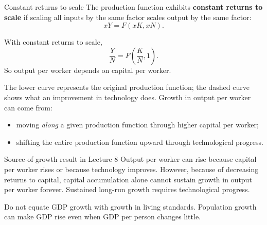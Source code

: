 \documentclass[12pt]{article}
\begin{document}
\begin{definition}{Constant returns to scale}{}
The production function exhibits \textbf{constant returns to scale} if scaling all inputs by the same factor scales output by the same factor:
\[
xY=F(xK,xN).
\]
\end{definition}

With constant returns to scale,
\[
\frac{Y}{N}=F\!\left(\frac{K}{N},1\right).
\]
So output per worker depends on capital per worker.

\begin{center}
\end{center}

The lower curve represents the original production function; the dashed curve shows what an improvement in technology does. Growth in output per worker can come from:
\begin{itemize}[leftmargin=1.5em]
\item moving \emph{along} a given production function through higher capital per worker;
\item shifting the entire production function upward through technological progress.
\end{itemize}

\begin{theorem}{Source-of-growth result in Lecture 8}{}
Output per worker can rise because capital per worker rises or because technology improves. However, because of decreasing returns to capital, capital accumulation alone cannot sustain growth in output per worker forever. Sustained long-run growth requires technological progress.
\end{theorem}

\begin{commonmistake}
Do not equate GDP growth with growth in living standards. Population growth can make GDP rise even when GDP per person changes little.
\end{commonmistake}
\end{document}
